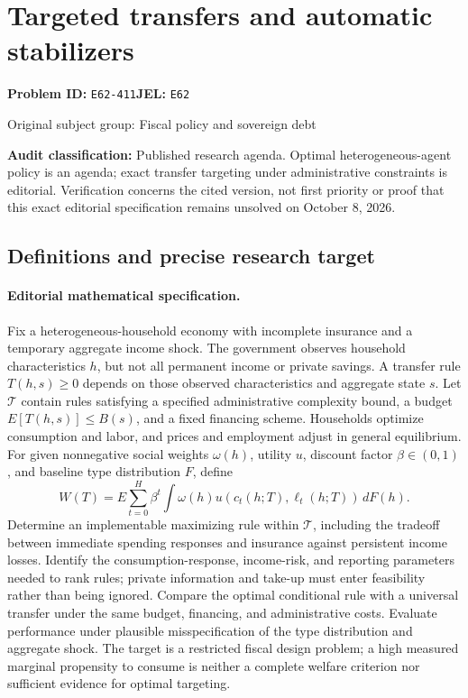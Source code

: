\documentclass[11pt,a4paper]{article}
\begin{document}
\section*{Targeted transfers and automatic stabilizers}
\textbf{Problem ID:} \texttt{E62-411}\quad \textbf{JEL:} \texttt{E62}\par
\label{problem:OP-0253}
{\sffamily\small\color{muted}Original subject group: Fiscal policy and sovereign debt\par}
\label{definitions:problem:30007534}
\textbf{Audit classification:} Published research agenda. Optimal heterogeneous-agent policy is an agenda; exact transfer targeting under administrative constraints is editorial. Verification concerns the cited version, not first priority or proof that this exact editorial specification remains unsolved on October 8, 2026.
\subsection*{Definitions and precise research target}
\paragraph{Editorial mathematical specification.} Fix a heterogeneous-household economy with incomplete insurance and a temporary aggregate income shock. The government observes household characteristics \(h\), but not all permanent income or private savings. A transfer rule \(T(h,s)\ge0\) depends on those observed characteristics and aggregate state \(s\). Let \(\mathcal T\) contain rules satisfying a specified administrative complexity bound, a budget \(E[T(h,s)]\le B(s)\), and a fixed financing scheme. Households optimize consumption and labor, and prices and employment adjust in general equilibrium.
For given nonnegative social weights \(\omega(h)\), utility \(u\), discount factor \(\beta\in(0,1)\), and baseline type distribution \(F\), define
\[
W(T)=E\sum_{t=0}^{H}\beta^t
\int\omega(h)u(c_t(h;T),\ell_t(h;T))\,dF(h).
\]
Determine an implementable maximizing rule within \(\mathcal T\), including the tradeoff between immediate spending responses and insurance against persistent income losses. Identify the consumption-response, income-risk, and reporting parameters needed to rank rules; private information and take-up must enter feasibility rather than being ignored. Compare the optimal conditional rule with a universal transfer under the same budget, financing, and administrative costs. Evaluate performance under plausible misspecification of the type distribution and aggregate shock. The target is a restricted fiscal design problem; a high measured marginal propensity to consume is neither a complete welfare criterion nor sufficient evidence for optimal targeting.
\end{document}
